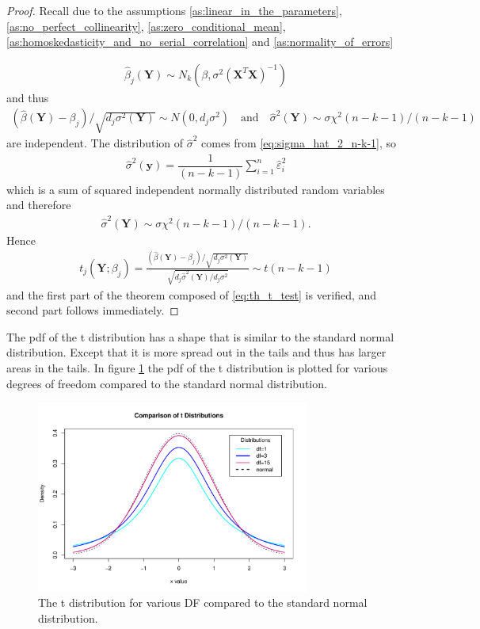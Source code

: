 \begin{proof}
Recall due to the assumptions \ref{as:linear_in_the_parameters}, \ref{as:no_perfect_collinearity}, \ref{as:zero_conditional_mean}, \ref{as:homoskedasticity_and_no_serial_correlation} and \ref{as:normality_of_errors}

\begin{align} \label{eq:th_t_test}
    \hat{\beta}_j(\textbf{Y}) \sim N_k(\beta,\sigma^2(\textbf{X}^T\textbf{X})^{-1})
\end{align}
and thus
\begin{align*}
    (\hat{\beta}(\textbf{Y})-\beta_j)/\sqrt{d_j\sigma^2(\textbf{Y})} \sim N(0,d_j \sigma^2) \quad \text{and} \quad \hat{\sigma}^2(\textbf{Y}) \sim \sigma\chi^2 (n-k-1)/(n-k-1)
\end{align*}
are independent.
The distribution of $\hat{\sigma}^2$ comes from \eqref{eq:sigma_hat_2_n-k-1}, so
\begin{align*}
    \hat{\sigma}^2(\textbf{y}) = \dfrac{1}{(n-k-1)}\sum_{i=1}^n \hat{\varepsilon}_i^2
\end{align*}
which is a sum of squared independent normally distributed random variables and therefore
\begin{align*}
\hat{\sigma}^2(\textbf{Y}) \sim \sigma\chi^2(n-k-1)/(n-k-1).    
\end{align*}
Hence
\begin{align*}
    t_j(\textbf{Y};\beta_j)=\frac{(\hat{\beta}(\textbf{Y})-\beta_j)/\sqrt{d_j\sigma^2(\textbf{Y})}}{\sqrt{d_j\hat{\sigma}^2(\textbf{Y})/d_j\sigma^2}} \sim t(n-k-1)
\end{align*}
and the first part of the theorem composed of \eqref{eq:th_t_test} is verified, and second part follows immediately. 
\end{proof}

The pdf of the t distribution has a shape that is similar to the standard normal distribution. Except that it is more spread out in the tails and thus has larger areas in the tails. In figure \ref{fig:t_distribution} the pdf of the t distribution is plotted for various degrees of freedom compared to the standard normal distribution. 

\begin{figure}[h]
    \centering
    \includegraphics[width = 0.8\textwidth]{figures/t_distribution.pdf}
    \caption{The t distribution for various DF compared to the standard normal distribution.}
    \label{fig:t_distribution}
\end{figure}

